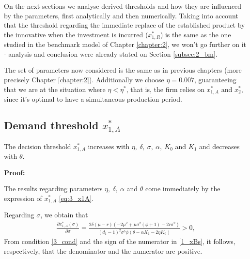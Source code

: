 \vspace{3mm}
On the next sections we analyse derived thresholds and how they are influenced by the parameters, first analytically and then numerically. 
Taking into account that the threshold regarding the immediate replace of the established product by the innovative when the investment is incurred ($x^*_{1,R}$) is the same as the one studied in the benchmark model of Chapter \ref{chapter:2}, we won't go further on it - analysis and conclusion were already stated on Section \ref{subsec:2_bm}.

The set of parameters now considered is the same as in previous chapters (more precisely Chapter \ref{chapter:2}). Additionally we choose $\eta=0.007$, guaranteeing that we are at the situation where $\eta <\eta^*$, that is, the firm relies on $x^*_{1,A}$ and $x^*_2$, since it's optimal to have a simultaneous production period.
\subsection{Demand threshold $x_{1,A}^*$}
\label{3_dmx1A}


\begin{prop}
	\label{3_propx1A}
	The decision threshold $x_{1,A}^*$ increases with $\eta, \ \delta, \ \sigma, \ \alpha, \ K_0$ and $K_1$ and decreases with $\theta$.
\end{prop}

\textbf{Proof:}

The results regarding parameters $\eta, \ \delta, \ \alpha $ and $\theta$ come immediately by the expression of $x_{1,A}^*$  \eqref{eq:3_x1A}.

Regarding $\sigma$, we obtain that
\begin{align*}
\frac{\partial x_{1,A}^* ( \sigma) }{\partial \sigma}=\frac{2 \delta  (\mu -r) \left(-2 \mu ^2+\mu  \sigma ^2 \left(\phi+1\right)-2 r \sigma ^2\right)}{(d_1-1)^2 \sigma ^5 \phi (\theta -\alpha  K_1 -2 \eta  K_0)}>0,
\end{align*}
From condition \eqref{3_cond} and the sign of the numerator in \eqref{1_xBs}, it follows, respectively, that the denominator and the numerator are positive.   %

